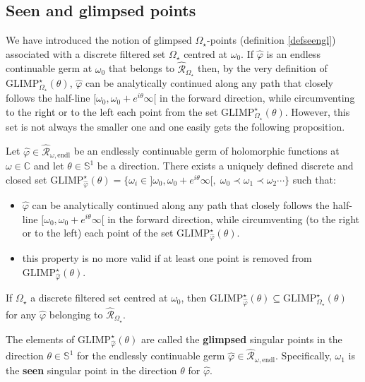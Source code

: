 \documentclass[11pt, english]{smfart}
\theoremstyle{definition}
\begin{document}
\subsection{Seen and glimpsed points}\label{sectionseenforvarphi}

We have introduced the notion of glimpsed $\Omega_\star$-points
(definition \ref{defseengl})
associated with a discrete filtered set  $\Omega_\star$ centred at $\omega_0$. If
$\widehat{\varphi}$ is an endless continuable germ at $\omega_0$ that
belongs to $\hat{\mathscr{R}}_{\Omega_\star}$ then, by the very
definition of $\mathrm{GLIMP}_{\Omega_\star}^\star(\theta)$,
$\widehat{\varphi}$ can be  analytically continued along any path that closely
follows the half-line $[\omega_0,
\omega_0+e^{i\theta}\infty[$ in the forward direction, while
circumventing to the right or to the left each point from the set
$\mathrm{GLIMP}_{\Omega_\star}^\star(\theta)$. However, this set is
not always the smaller one and one easily gets the following proposition.

\begin{prop}\label{propdefseenglgerms}
Let  ${ \widehat{\varphi} \in \hat{\mathscr{R}}_{\omega,
    \mathrm{endl}}}$ be an endlessly continuable
germ of holomorphic functions at $\omega \in \mathbb{C}$ and let
$\theta \in \mathbb{S}^1$ be a direction. There exists
a uniquely defined discrete and closed set
$\mathrm{GLIMP}_{\widehat{\varphi}}^\star(\theta) = \{\omega_i \in ]\omega_0,
\omega_0+e^{i\theta}\infty[, \; \omega_0 \prec \omega_{1} \prec \omega_{2} \cdots  \}$
such that:
\begin{itemize}
\item $\widehat{\varphi}$ can be  analytically continued along any path that closely
follows the half-line $[\omega_0,
\omega_0+e^{i\theta}\infty[$ in the forward direction, while circumventing
(to the right or to the left) each point of the set
$\mathrm{GLIMP}_{\widehat{\varphi}}^\star(\theta)$.
\item this property is no more valid if at least one point is removed
  from $\mathrm{GLIMP}_{\widehat{\varphi}}^\star(\theta)$. 
\end{itemize}
If $\Omega_\star$ a discrete filtered set centred at $\omega_0$, 
then ${\mathrm{GLIMP}_{\widehat{\varphi}}^\star(\theta) \subseteq
\mathrm{GLIMP}_{\Omega_\star}^\star(\theta)}$ for any
$\widehat{\varphi}$ belonging to $\hat{\mathscr{R}}_{\Omega_\star}$.
\end{prop}

\begin{defi}\label{defseenglgerms}
The elements of $\mathrm{GLIMP}_{\widehat{\varphi}}^\star(\theta)$  are called the \textbf{glimpsed}
singular points in the direction $\theta \in \mathbb{S}^1$ for the endlessly
continuable germ ${ \widehat{\varphi} \in \hat{\mathscr{R}}_{\omega,
    \mathrm{endl}}}$.  Specifically, $\omega_1$ is
the \textbf{seen} singular point in the direction $\theta$ for $\widehat{\varphi}$.
\end{defi}
\end{document}
